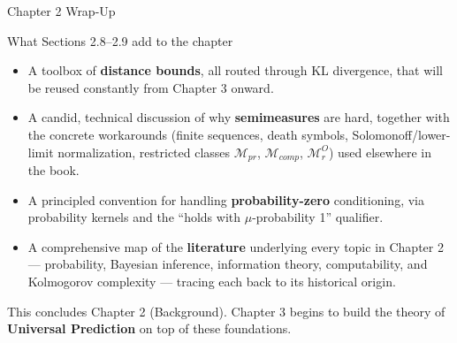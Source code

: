\documentclass[aspectratio=169,10pt]{beamer}
\begin{document}
\begin{frame}{Chapter 2 Wrap-Up}
  \begin{block}{What Sections 2.8--2.9 add to the chapter}
    \begin{itemize}
      \item A toolbox of \textbf{distance bounds}, all routed through KL
        divergence, that will be reused constantly from Chapter 3 onward.
      \item A candid, technical discussion of why \textbf{semimeasures} are
        hard, together with the concrete workarounds (finite sequences,
        death symbols, Solomonoff/lower-limit normalization, restricted
        classes $\mathcal{M}_{pr}$, $\mathcal{M}_{comp}$, $\mathcal{M}_r^O$)
        used elsewhere in the book.
      \item A principled convention for handling \textbf{probability-zero}
        conditioning, via probability kernels and the ``holds with
        $\mu$-probability 1'' qualifier.
      \item A comprehensive map of the \textbf{literature} underlying every
        topic in Chapter 2 --- probability, Bayesian inference, information
        theory, computability, and Kolmogorov complexity --- tracing each
        back to its historical origin.
    \end{itemize}
  \end{block}

  This concludes Chapter 2 (Background). Chapter 3 begins to build the
  theory of \textbf{Universal Prediction} on top of these foundations.
\end{frame}
\end{document}
